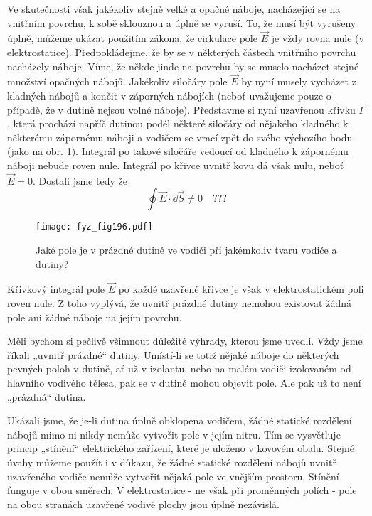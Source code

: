   Ve skutečnosti však jakékoliv stejně velké a opačné náboje, nacházející se na vnitřním 
  povrchu, k sobě sklouznou a úplně se vyruší. To, že musí být vyrušeny úplně, můžeme ukázat 
  použitím zákona, že cirkulace pole \(\vec{E}\) je vždy rovna nule (v elektrostatice). 
  Předpokládejme, že by se v některých částech vnitřního povrchu nacházely náboje. Víme, že 
  někde jinde na povrchu by se muselo nacházet stejné množství  opačných nábojů. Jakékoliv 
  siločáry pole \(\vec{E}\) by nyní musely vycházet z kladných nábojů a končit v záporných 
  nábojích (neboť uvažujeme pouze o případě, že v dutině nejsou volné náboje). Představme si 
  nyní uzavřenou křivku \(\Gamma\), která prochází napříč dutinou podél některé siločáry od 
  nějakého kladného k některému zápornému náboji a vodičem se vrací zpět do svého výchozího 
  bodu. (jako na obr. \ref{fyz:fig196}). Integrál po takové siločáře vedoucí od kladného k 
  zápornému náboji nebude roven nule. Integrál po křivce uvnitř kovu dá však nulu, 
  neboť \(\vec{E}=0\). Dostali jsme tedy že
  \begin{equation}\label{fyz:eq_fey_elstat_gauss08}
    \oint \vec{E}\cdot\dd{\vec{S}} \neq 0  \quad ???
  \end{equation}

  \begin{figure}[ht!] %
    \centering
    \texttt{[image: fyz\_fig196.pdf]}
    \caption{Jaké pole je v prázdné dutině ve vodiči při jakémkoliv tvaru vodiče a dutiny?}
    \label{fyz:fig196}
  \end{figure}
  Křivkový integrál pole \(\vec{E}\) po každé uzavřené křivce je však v elektrostatickém poli 
  roven nule. Z toho vyplývá, že uvnitř prázdné dutiny nemohou existovat žádná pole ani žádné 
  náboje na jejím povrchu.
  
  Měli bychom si pečlivě všimnout důležité výhrady, kterou jsme uvedli. Vždy jsme říkali 
  „uvnitř prázdné“ dutiny. Umístí-li se totiž nějaké náboje do některých pevných poloh v 
  dutině, ať už v izolantu, nebo na malém vodiči izolovaném od hlavního vodivého tělesa, pak se 
  v dutině mohou objevit pole. Ale pak už to není „prázdná“ dutina.
  
  Ukázali jsme, že je-li dutina úplně obklopena vodičem, žádné statické rozdělení nábojů mimo 
  ni nikdy nemůže vytvořit pole v jejím nitru. Tím se vysvětluje princip „stínění“ elektrického 
  zařízení, které je uloženo v kovovém obalu. Stejné úvahy můžeme použít i v důkazu, že žádné 
  statické rozdělení nábojů uvnitř uzavřeného vodiče nemůže vytvořit nějaká pole ve vnějším 
  prostoru. Stínění funguje v obou směrech. V elektrostatice - ne však při proměnných polích - 
  pole na obou stranách uzavřené vodivé plochy jsou úplně nezávislá.
  
